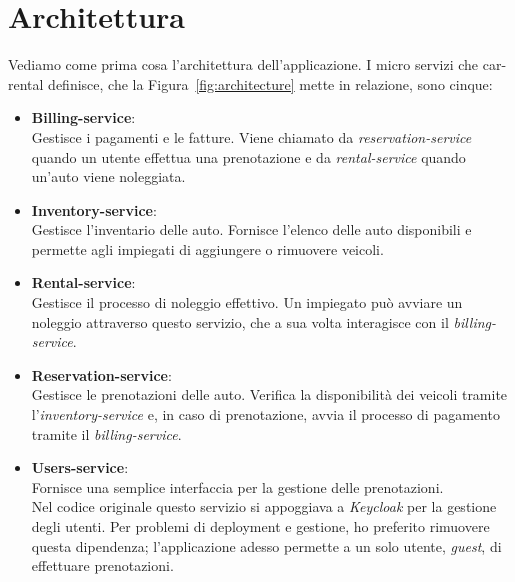 \section{Architettura}
\label{sec:servizi}
Vediamo come prima cosa l'architettura dell'applicazione. I micro servizi che car-rental definisce, che la Figura~\ref{fig:architecture} mette in relazione, sono cinque:
\begin{itemize}
    \item \textbf{Billing-service}: \\
        Gestisce i pagamenti e le fatture. Viene chiamato da \textit{reservation-service} quando un utente effettua una prenotazione e da \textit{rental-service} quando un'auto viene noleggiata.
    \item \textbf{Inventory-service}: \\
        Gestisce l'inventario delle auto. Fornisce l'elenco delle auto disponibili e permette agli impiegati di aggiungere o rimuovere veicoli.
    \item \textbf{Rental-service}: \\
        Gestisce il processo di noleggio effettivo. Un impiegato può avviare un noleggio attraverso questo servizio, che a sua volta interagisce con il \textit{billing-service}.
    \item \textbf{Reservation-service}: \\
        Gestisce le prenotazioni delle auto. Verifica la disponibilità dei veicoli tramite l'\textit{inventory-service} e, in caso di prenotazione, avvia il processo di pagamento tramite il \textit{billing-service}.
    \item \textbf{Users-service}: \\
        Fornisce una semplice interfaccia per la gestione delle prenotazioni. \\
        Nel codice originale questo servizio si appoggiava a \textit{Keycloak} per la gestione degli utenti. Per problemi di deployment e gestione, ho preferito rimuovere questa dipendenza; l'applicazione adesso permette a un solo utente, \textit{guest}, di effettuare prenotazioni.
\end{itemize}

